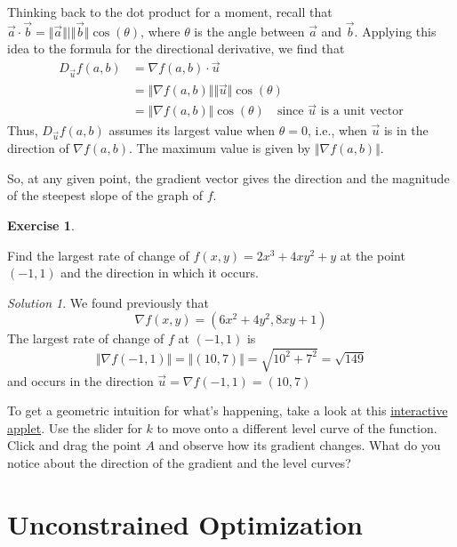 \documentclass[
]{book}
\theoremstyle{definition}
\theoremstyle{definition}
\theoremstyle{definition}
\newtheorem{exercise}{Exercise}[chapter]
\theoremstyle{definition}
\theoremstyle{remark}
\newtheorem*{solution}{Solution}
\begin{document}
Thinking back to the dot product for a moment, recall that \(\vec{a}\cdot\vec{b}=\Vert\vec{a}\Vert| \Vert\vec{b}\Vert\cos(\theta)\), where \(\theta\) is the angle between \(\vec{a}\) and \(\vec{b}\). Applying this idea to the formula for the directional derivative, we find that
\begin{align*}
D_{\vec{u}}f(a,b)&=\nabla f(a,b)\cdot \vec{u} \\
&= \Vert \nabla f(a,b)\Vert \Vert \vec{u} \Vert \cos(\theta)\\
&= \Vert \nabla f(a,b)\Vert \cos(\theta) \quad \mbox{since $\vec{u}$ is a unit vector}
\end{align*}
Thus, \(D_{\vec{u}}f(a,b)\) assumes its largest value when \(\theta=0\), i.e., when \(\vec{u}\) is in the direction of \(\nabla f(a,b)\). The maximum value is given by \(\Vert \nabla f(a,b)\Vert\).

So, at any given point, the gradient vector gives the direction and the magnitude of the steepest slope of the graph of \(f\).

\begin{exercise}
\protect\hypertarget{exr:unlabeled-div-51}{}\label{exr:unlabeled-div-51}

Find the largest rate of change of \(f(x,y)=2x^3+4xy^2+y\) at the point \((-1,1)\) and the direction in which it occurs.

\end{exercise}

\begin{solution}

We found previously that \[\nabla f(x,y) = (6x^2+4y^2, 8xy+1)\]
The largest rate of change of \(f\) at \((-1,1)\) is \[\Vert \nabla f(-1,1)\Vert = \Vert (10,7)\Vert = \sqrt{10^2+7^2} = \sqrt{149}\] and occurs in the direction \(\vec{u}=\nabla f(-1,1)=(10,7)\)

To get a geometric intuition for what's happening, take a look at this \href{https://www.geogebra.org/m/wcjgt8da}{interactive applet}. Use the slider for \(k\) to move onto a different level curve of the function. Click and drag the point \(A\) and observe how its gradient changes. What do you notice about the direction of the gradient and the level curves?

\end{solution}

\hypertarget{lec-8}{%
\chapter{Unconstrained Optimization}\label{lec-8}}
\end{document}
